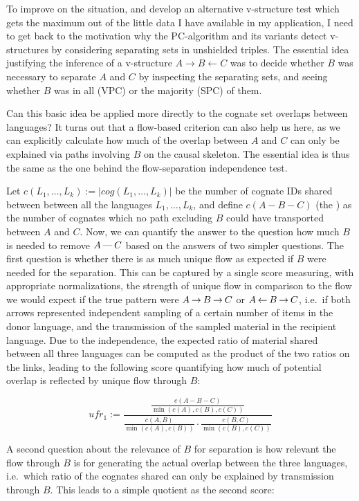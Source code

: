 To improve on the situation, and develop an alternative v-structure test which gets the maximum out of the little data I have available in my application, I need to get back to the motivation why the PC-algorithm and its variants detect v-structures by considering separating sets in unshielded triples. The essential idea justifying the inference of a v-structure $A \rightarrow B \leftarrow C$ was to decide whether $B$ was necessary to separate $A$ and $C$ by inspecting the separating sets, and seeing whether $B$ was in all (VPC) or the majority (SPC) of them.

Can this basic idea be applied more directly to the cognate set overlaps between languages? It turns out that a flow-based criterion can also help us here, as we can explicitly calculate how much of the overlap between $A$ and $C$ can only be explained via paths involving $B$ on the causal skeleton. The essential idea is thus the same as the one behind the flow-separation independence test.

Let $c(L_1,\dots,L_k) := |cog(L_1,\dots,L_k)|$ be the number of cognate IDs shared between between all the languages $L_1,\dots,L_k$, and define $c(A-B-C)$ (the \textit{}) as the number of cognates which no path excluding $B$ could have transported between $A$ and $C$. Now, we can quantify the answer to the question how much $B$ is needed to remove $A \kern 2pt\hbox{---}\kern 2pt C$ based on the answers of two simpler questions. The first question is whether there is as much unique flow as expected if $B$ were needed for the separation. This can be captured by a single score measuring, with appropriate normalizations, the strength of unique flow in comparison to the flow we would expect if the true pattern were $A \kern 2pt\hbox{$\rightarrow$}\kern 2pt B \kern 2pt\hbox{$\rightarrow$}\kern 2pt C$ or $A \kern 2pt\hbox{$\leftarrow$}\kern 2pt B \kern 2pt\hbox{$\rightarrow$}\kern 2pt C$, i.e.\ if both arrows represented independent sampling of a certain number of items in the donor language, and the transmission of the sampled material in the recipient language. Due to the independence, the expected ratio of material shared 
between all three languages can be computed as the product of the two ratios on the links, leading to the following score quantifying how much of potential overlap is reflected by unique flow through $B$:

\begin{equation*}
 ufr_1 := \frac{\frac{c(A-B-C)}{\min(c(A),c(B),c(C))}}
	      {\frac{c(A,B)}{\min(c(A),c(B))}\cdot\frac{c(B,C)}{\min(c(B),c(C))}}
\end{equation*}

A second question about the relevance of $B$ for separation is how relevant the flow through $B$ is for generating the actual overlap between the three languages, i.e.\ which ratio of the cognates shared can only be explained by transmission through $B$. This leads to a simple quotient as the second score:

